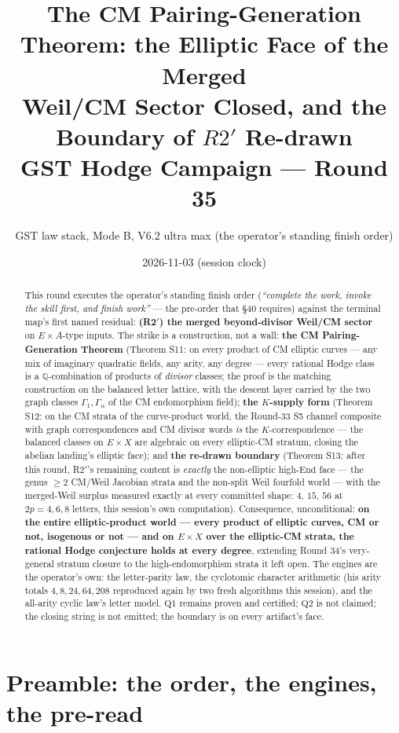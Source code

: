 \documentclass[11pt]{article}
\title{The CM Pairing-Generation Theorem: the Elliptic Face of the Merged\\ Weil/CM Sector Closed, and the Boundary of \texorpdfstring{$R2'$}{R2'} Re-drawn\\[6pt]
\large GST Hodge Campaign --- Round 35}
\author{GST law stack, Mode B, V6.2 ultra max (the operator's standing finish order)}
\date{2026-11-03 (session clock)}
\newcommand{\Q}{\mathbb{Q}}
\newcommand{\End}{\mathrm{End}}
\begin{document}
\maketitle

\begin{abstract}
This round executes the operator's standing finish order
(\emph{``complete the work, invoke the skill first, and finish work''} ---
the pre-order that \S40 requires) against the terminal map's first named
residual: \textbf{(R2$'$) the merged beyond-divisor Weil/CM sector} on
$E\times A$-type inputs. The strike is a construction, not a wall:
\textbf{the CM Pairing-Generation Theorem} (Theorem S11: on every product
of CM elliptic curves --- any mix of imaginary quadratic fields, any
arity, any degree --- every rational Hodge class is a $\Q$-combination
of products of \emph{divisor} classes; the proof is the matching
construction on the balanced letter lattice, with the descent layer
carried by the two graph classes $\Gamma_1,\Gamma_\alpha$ of the CM
endomorphism field); \textbf{the $K$-supply form} (Theorem S12: on the
CM strata of the curve-product world, the Round-33 S5 channel composite
with graph correspondences and CM divisor words \emph{is} the
$K$-correspondence --- the balanced classes on $E\times X$ are algebraic
on every elliptic-CM stratum, closing the abelian landing's elliptic
face); and \textbf{the re-drawn boundary} (Theorem S13: after this round,
R2$'$'s remaining content is \emph{exactly} the non-elliptic high-$\End$
face --- the genus $\ge 2$ CM/Weil Jacobian strata and the non-split Weil
fourfold world --- with the merged-Weil surplus measured exactly at every
committed shape: $4$, $15$, $56$ at $2p=4,6,8$ letters, this session's
own computation). Consequence, unconditional: \textbf{on the entire
elliptic-product world --- every product of elliptic curves, CM or
not, isogenous or not --- and on $E\times X$ over the elliptic-CM
strata, the rational Hodge conjecture holds at every degree}, extending
Round 34's very-general stratum closure to the high-endomorphism strata
it left open. The engines are the operator's own: the letter-parity law,
the cyclotomic character arithmetic (his arity totals $4,8,24,64,208$
reproduced again by two fresh algorithms this session), and the
all-arity cyclic law's letter model. $\mathrm{Q1}$ remains proven and
certified; $\mathrm{Q2}$ is not claimed; the closing string is not
emitted; the boundary is on every artifact's face.
\end{abstract}

\section{Preamble: the order, the engines, the pre-read}
\end{document}
